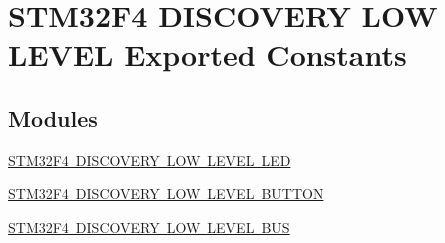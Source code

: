 \hypertarget{group___s_t_m32_f4___d_i_s_c_o_v_e_r_y___l_o_w___l_e_v_e_l___exported___constants}{}\section{S\+T\+M32\+F4 D\+I\+S\+C\+O\+V\+E\+RY L\+OW L\+E\+V\+EL Exported Constants}
\label{group___s_t_m32_f4___d_i_s_c_o_v_e_r_y___l_o_w___l_e_v_e_l___exported___constants}
\subsection*{Modules}
\begin{DoxyCompactItemize}
\item 
\mbox{\hyperlink{group___s_t_m32_f4___d_i_s_c_o_v_e_r_y___l_o_w___l_e_v_e_l___l_e_d}{S\+T\+M32\+F4 D\+I\+S\+C\+O\+V\+E\+R\+Y L\+O\+W L\+E\+V\+E\+L L\+ED}}
\item 
\mbox{\hyperlink{group___s_t_m32_f4___d_i_s_c_o_v_e_r_y___l_o_w___l_e_v_e_l___b_u_t_t_o_n}{S\+T\+M32\+F4 D\+I\+S\+C\+O\+V\+E\+R\+Y L\+O\+W L\+E\+V\+E\+L B\+U\+T\+T\+ON}}
\item 
\mbox{\hyperlink{group___s_t_m32_f4___d_i_s_c_o_v_e_r_y___l_o_w___l_e_v_e_l___b_u_s}{S\+T\+M32\+F4 D\+I\+S\+C\+O\+V\+E\+R\+Y L\+O\+W L\+E\+V\+E\+L B\+US}}
\end{DoxyCompactItemize}
